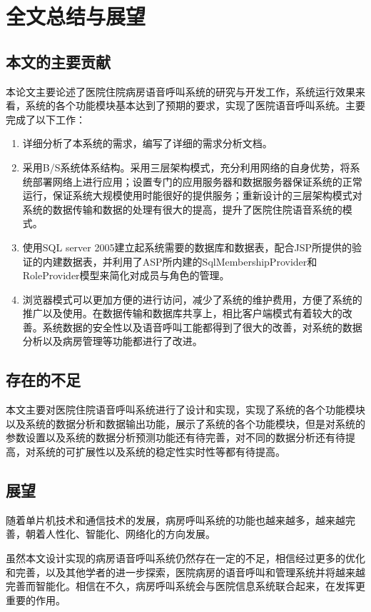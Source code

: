 
\chapter{全文总结与展望}
\section{本文的主要贡献}
本论文主要论述了医院住院病房语音呼叫系统的研究与开发工作，系统运行效果来看，系统的各个功能模块基本达到了预期的要求，实现了医院语音呼叫系统。主要完成了以下工作：
\begin{enumerate}
\item 详细分析了本系统的需求，编写了详细的需求分析文档。
\item 采用B/S系统体系结构。采用三层架构模式，充分利用网络的自身优势，将系统部署网络上进行应用；设置专门的应用服务器和数据服务器保证系统的正常运行，保证系统大规模使用时能很好的提供服务；重新设计的三层架构模式对系统的数据传输和数据的处理有很大的提高，提升了医院住院语音系统的模式。
\item 使用SQL server 2005建立起系统需要的数据库和数据表，配合JSP所提供的验证的内建数据表，并利用了ASP所内建的SqlMembershipProvider和RoleProvider模型来简化对成员与角色的管理。
\item 浏览器模式可以更加方便的进行访问，减少了系统的维护费用，方便了系统的推广以及使用。在数据传输和数据库共享上，相比客户端模式有着较大的改善。系统数据的安全性以及语音呼叫工能都得到了很大的改善，对系统的数据分析以及病房管理等功能都进行了改进。 
\end{enumerate}

\section{存在的不足}
本文主要对医院住院语音呼叫系统进行了设计和实现，实现了系统的各个功能模块以及系统的数据分析和数据输出功能，展示了系统的各个功能模块，但是对系统的参数设置以及系统的数据分析预测功能还有待完善，对不同的数据分析还有待提高，对系统的可扩展性以及系统的稳定性实时性等都有待提高。

\section{展望}
随着单片机技术和通信技术的发展，病房呼叫系统的功能也越来越多，越来越完善，朝着人性化、智能化、网络化的方向发展。

虽然本文设计实现的病房语音呼叫系统仍然存在一定的不足，相信经过更多的优化和完善，以及其他学者的进一步探索，医院病房的语音呼叫和管理系统并将越来越完善而智能化。相信在不久，病房呼叫系统会与医院信息系统联合起来，在发挥更重要的作用。